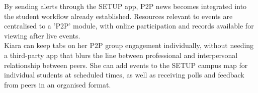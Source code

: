 By sending alerts through the SETUP app, P2P news becomes integrated into the student workflow already established. Resources relevant to events are centralised to a 'P2P' module, with online participation and records available for viewing after live events.\\

Kiara can keep tabs on her P2P group engagement individually, without needing a third-party app that blurs the line between professional and interpersonal relationship between peers. She can add events to the SETUP campus map for individual students at scheduled times, as well as receiving polls and feedback from peers in an organised format.